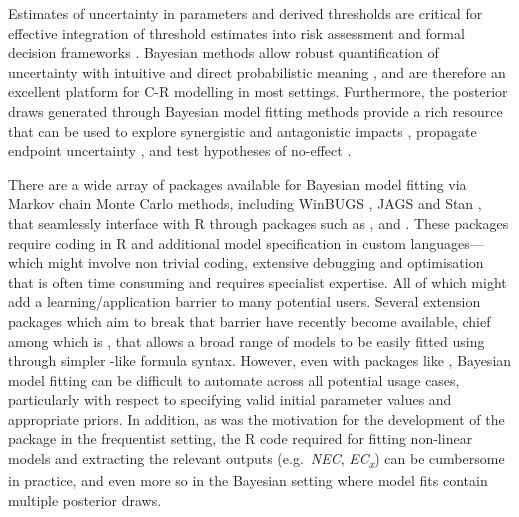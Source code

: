 Estimates of uncertainty in parameters and derived thresholds are
critical for effective integration of threshold estimates into risk
assessment and formal decision frameworks \citep{fisher2018c}. Bayesian
methods allow robust quantification of uncertainty with intuitive and
direct probabilistic meaning \citep{Ellison1996}, and are therefore an
excellent platform for C-R modelling in most settings. Furthermore, the
posterior draws generated through Bayesian model fitting methods provide
a rich resource that can be used to explore synergistic and antagonistic
impacts \citep{Fisher2019d, flores2021}, propagate endpoint uncertainty
\citep{Charles2020a, Gottschalk2013}, and test hypotheses of no-effect
\citep{Thomas2006}.

There are a wide array of packages available for Bayesian model fitting
via Markov chain Monte Carlo methods, including WinBUGS
\citep{Lunn2000}, JAGS \citep{Plummer2003} and Stan
\citep{Carpenter2017}, that seamlessly interface with R through packages
such as ,  \citep{Su2015} and 
\citep{rstan2021}. These packages require coding in R and additional
model specification in custom languages---which might involve non
trivial coding, extensive debugging and optimisation that is often time
consuming and requires specialist expertise. All of which might add a
learning/application barrier to many potential users. Several extension
packages which aim to break that barrier have recently become available,
chief among which is  \citep{Burkner2017}, that allows a broad
range of models to be easily fitted using  through simpler
-like formula syntax. However, even with packages like
, Bayesian model fitting can be difficult to automate across
all potential usage cases, particularly with respect to specifying valid
initial parameter values and appropriate priors. In addition, as was the
motivation for the development of the  package in the
frequentist setting, the R code required for fitting non-linear models
and extracting the relevant outputs (e.g.~\emph{NEC},
\emph{EC\textsubscript{x}}) can be cumbersome in practice, and even more
so in the Bayesian setting where model fits contain multiple posterior
draws.

